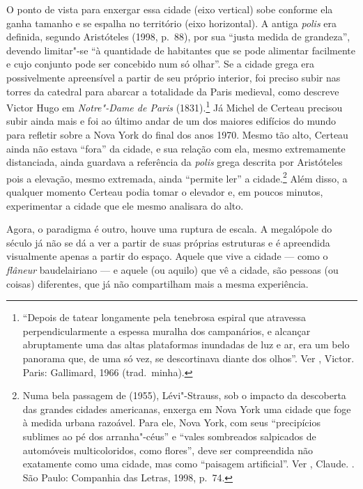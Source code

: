 O ponto de vista para enxergar essa cidade (eixo vertical) sobe conforme
ela ganha tamanho e se espalha no território (eixo horizontal). A antiga
\emph{polis} era definida, segundo Aristóteles (1998, p.~88), por sua
``justa medida de grandeza'', devendo limitar"-se ``à quantidade de
habitantes que se pode alimentar facilmente e cujo conjunto pode ser
concebido num só olhar''. Se a cidade grega era possivelmente
apreensível a partir de seu próprio interior, foi preciso subir nas
torres da catedral para abarcar a totalidade da Paris medieval, como
descreve Victor Hugo em \emph{Notre"-Dame de Paris} (1831).\footnote{``Depois
  de tatear longamente pela tenebrosa espiral que atravessa
  perpendicularmente a espessa muralha dos campanários, e alcançar
  abruptamente uma das altas plataformas inundadas de luz e ar, era um
  belo panorama que, de uma só vez, se descortinava diante dos olhos''.
  Ver , Victor. {} Paris: Gallimard, 1966
  (trad.~minha).} Já Michel de Certeau precisou subir ainda mais e foi
ao último andar de um dos maiores edifícios do mundo para refletir sobre
a Nova York do final dos anos 1970. Mesmo tão alto, Certeau ainda não
estava ``fora'' da cidade, e sua relação com ela, mesmo extremamente
distanciada, ainda guardava a referência da \emph{polis} grega descrita
por Aristóteles pois a elevação, mesmo extremada, ainda ``permite ler''
a cidade.\footnote{Numa bela passagem de {} (1955), Lévi"-Strauss, sob o impacto da descoberta das grandes cidades americanas, enxerga em Nova York uma cidade que foge à medida urbana razoável. Para ele, Nova York, com seus ``precipícios sublimes ao pé dos arranha"-céus'' e ``vales sombreados salpicados de automóveis multicoloridos, como flores'', deve ser compreendida não exatamente como uma cidade, mas como ``paisagem artificial''. Ver , Claude. {}. São Paulo: Companhia das Letras, 1998, p.~74.} Além disso, a qualquer momento Certeau podia tomar o elevador
e, em poucos minutos, experimentar a cidade que ele mesmo analisara do
alto.

Agora, o paradigma é outro, houve uma ruptura de escala. A megalópole do
século  já não se dá a ver a partir de suas próprias estruturas e é
apreendida visualmente apenas a partir do espaço. Aquele que vive a
cidade --- como o \emph{flâneur} baudelairiano --- e aquele (ou aquilo)
que vê a cidade, são pessoas (ou coisas) diferentes, que já não
compartilham mais a mesma experiência.

